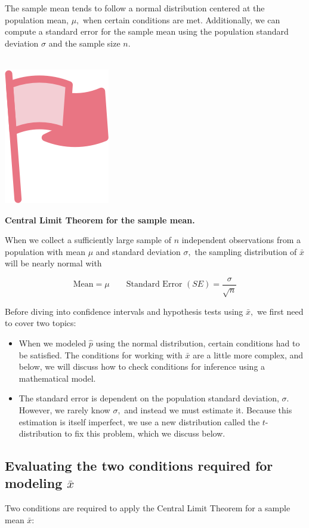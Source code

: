 \documentclass[
  10pt,
  openany]{book}
\providecommand{\tightlist}{%
  \setlength{\itemsep}{0pt}\setlength{\parskip}{0pt}}
\newenvironment{mdframedwithfootImportant}
{   
    \savenotes
    \begin{mdframed}[%
    topline=true, bottomline=true, linecolor=oiR, linewidth=0.5pt,
    rightline=false, leftline=false,
    backgroundcolor=oiLGray]
    \renewcommand{\thempfootnote}{\arabic{footnote}}
    }
{
    \end{mdframed}
    \spewnotes
}
\newenvironment{important}{
    \let\oldtextbf\textbf
    \renewcommand{\textbf}[1]{{\textcolor{oiR}{\oldtextbf{##1}}}}
\vspace{4mm}
\begin{mdframedwithfootImportant}
\begin{minipage}[t]{0.10\textwidth}
{$\:$ \\ \setkeys{Gin}{width=2.5em,keepaspectratio}\includegraphics{images/_icons/important.png}}
\end{minipage}
\hfill
\begin{minipage}[t]{0.90\textwidth}
\vspace{-2mm}
\setlength{\parskip}{1em}
}{\end{minipage}
\end{mdframedwithfootImportant}
\vspace{4mm}
}
\begin{document}
The sample mean tends to follow a normal distribution centered at the population mean, \(\mu,\) when certain conditions are met.
Additionally, we can compute a standard error for the sample mean using the population standard deviation \(\sigma\) and the sample size \(n.\)

\begin{important}
\textbf{Central Limit Theorem for the sample mean.}

When we collect a sufficiently large sample of \(n\) independent observations from a population with mean \(\mu\) and standard deviation \(\sigma,\) the sampling distribution of \(\bar{x}\) will be nearly normal with

\[\text{Mean} = \mu \qquad \text{Standard Error }(SE) = \frac{\sigma}{\sqrt{n}}\]

\end{important}

Before diving into confidence intervals and hypothesis tests using \(\bar{x},\) we first need to cover two topics:

\begin{itemize}
\tightlist
\item
  When we modeled \(\hat{p}\) using the normal distribution, certain conditions had to be satisfied. The conditions for working with \(\bar{x}\) are a little more complex, and below, we will discuss how to check conditions for inference using a mathematical model.
\item
  The standard error is dependent on the population standard deviation, \(\sigma.\) However, we rarely know \(\sigma,\) and instead we must estimate it. Because this estimation is itself imperfect, we use a new distribution called the \(t\)-distribution to fix this problem, which we discuss below.
\end{itemize}


\hypertarget{evaluating-the-two-conditions-required-for-modeling-barx}{%
\subsection{\texorpdfstring{Evaluating the two conditions required for modeling \(\bar{x}\)}{Evaluating the two conditions required for modeling \textbackslash bar\{x\}}}\label{evaluating-the-two-conditions-required-for-modeling-barx}}

Two conditions are required to apply the Central Limit Theorem for a sample mean \(\bar{x}:\)
\end{document}
